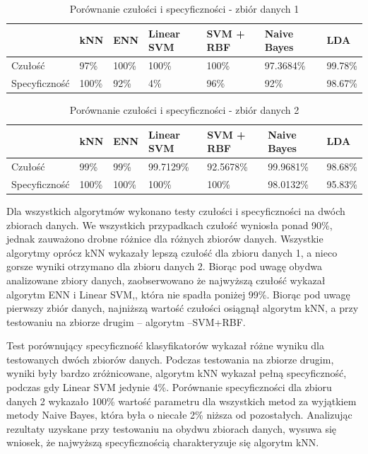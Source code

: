 \documentclass[[10pt,a4paper]{article}
\begin{document}
\begin{table}[h]
\centering
\caption{Porównanie czułości i specyficzności - zbiór danych 1}
\label{sens1}
\begin{tabular}{|l|l|l|l|l|l|l|}
\hline
              & kNN & ENN & Linear SVM & SVM + RBF & Naive Bayes & LDA \\ \hline
Czułość       &  97\%  & 100\%  &    100\%    &    100\%   &      97.3684\% & 99.78\%     \\ \hline
Specyficzność &   100\%   &  92\%   &     4\%       &     96\%   &       92\%  & 98.67\%    \\ \hline
\end{tabular}
\end{table}


\begin{table}[h]
\centering
\caption{Porównanie czułości i specyficzności - zbiór danych 2}
\label{sens2}
\begin{tabular}{|l|l|l|l|l|l|l|}
\hline
              & kNN & ENN & Linear SVM & SVM + RBF & Naive Bayes & LDA\\ \hline
Czułość       &  99\%   &  99\%   &    99.7129\%        &     92.5678\%       &   99.9681\%   & 98.68\%       \\ \hline
Specyficzność &  100\%   &  100\%   &     100\%       &      100\%     &   98.0132\%     & 95.83\%     \\ \hline
\end{tabular}
\end{table}

Dla wszystkich algorytmów wykonano testy czułości i specyficzności na dwóch zbiorach danych. We wszystkich przypadkach czułość wyniosła ponad 90\%, jednak zauważono drobne różnice dla różnych zbiorów danych. Wszystkie algorytmy oprócz kNN wykazały lepszą czułość dla zbioru danych 1, a nieco gorsze wyniki otrzymano dla zbioru danych 2. Biorąc pod uwagę obydwa analizowane zbiory danych, zaobserwowano że najwyższą czułość wykazał algorytm ENN i Linear SVM,, która nie spadła poniżej 99\%. Biorąc pod uwagę pierwszy zbiór danych, najniższą wartość czułości osiągnął algorytm kNN, a przy testowaniu na zbiorze drugim – algorytm –SVM+RBF.

Test porównujący specyficzność klasyfikatorów wykazał różne wyniku dla testowanych dwóch zbiorów danych. Podczas testowania na zbiorze drugim, wyniki były bardzo zróżnicowane, algorytm kNN wykazał pełną specyficzność, podczas gdy Linear SVM jedynie 4\%. Porównanie specyficzności dla zbioru danych 2 wykazało 100\% wartość parametru dla wszystkich metod za wyjątkiem metody Naive Bayes, która była o niecałe 2\% niższa od pozostałych. Analizując rezultaty uzyskane przy testowaniu na obydwu zbiorach danych, wysuwa się wniosek, że najwyższą specyficznością charakteryzuje się algorytm kNN. \\
\end{document}
